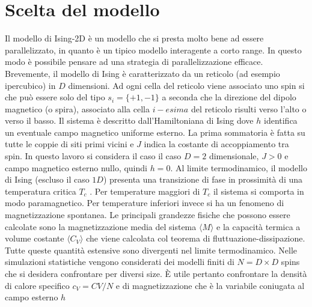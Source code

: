 \documentclass[a4paper,12pt]{article}
\begin{document}
\section{Scelta del modello}
Il modello di Ising-2D è un modello che si presta molto bene ad essere parallelizzato, in quanto è un tipico modello interagente a corto range. In questo modo è possibile pensare ad una strategia di parallelizzazione efficace. Brevemente, il modello di Ising è caratterizzato da un reticolo (ad esempio ipercubico) in $D$ dimensioni. Ad ogni cella del reticolo viene associato uno spin si che può essere solo del tipo $s_i=\lbrace +1, -1 \rbrace$ a seconda che la direzione del dipolo magnetico (o spira), associato alla cella $i-esima$ del reticolo risulti verso l'alto o verso il basso. Il sistema è descritto dall’Hamiltoniana di Ising
dove $h$ identifica un eventuale campo magnetico uniforme esterno. La prima sommatoria è fatta su tutte le coppie di siti primi vicini e $J$ indica la costante di accoppiamento tra spin. In questo lavoro si considera il caso il caso $D = 2$ dimensionale, $J > 0$ e campo magnetico esterno nullo, quindi $h = 0$. Al limite termodinamico, il modello di Ising (escluso il caso $1D$) presenta una transizione di fase in prossimità di una temperatura critica $T_c$ . Per temperature maggiori di $T_c$ il sistema si comporta in modo paramagnetico. Per temperature inferiori invece si ha un fenomeno di magnetizzazione spontanea. Le principali grandezze fisiche che possono essere calcolate sono la magnetizzazione media del sistema $\langle M\rangle$  e la capacità termica a volume costante $\langle C_V \rangle$ che viene calcolata col teorema di fluttuazione-dissipazione. Tutte queste quantità estensive sono divergenti nel limite termodinamico. Nelle simulazioni statistiche vengono considerati dei modelli finiti di $N = D \times D$ spins che si desidera confrontare per diversi size. È utile pertanto confrontare la densità di calore specifico $c_V = CV /N$ e di magnetizzazione che è la variabile coniugata al campo esterno $h$
\end{document}
